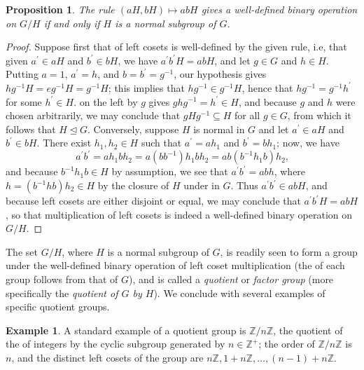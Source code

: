 \documentclass{article}
\theoremstyle{plain}
\newtheorem*{proposition*}{Proposition}
\theoremstyle{definition}
\newtheorem*{example*}{Example}
\begin{document}
\begin{proposition*}
The rule $(aH,bH)\mapsto abH$ gives a well-defined binary operation on $G/H$ if and only if $H$ is a normal subgroup 
of $G$.
\end{proposition*} 
\begin{proof}
Suppose first that  of left cosets is well-defined by the given rule, i.e, that given $a^\prime\in aH$ and 
$b^\prime\in bH$, we have $a^\prime b^\prime H=abH$, and let $g\in G$ and $h\in H$. Putting $a=1$, $a^\prime=h$, and $b=b^\prime=g^{-1}$, our hypothesis gives $hg^{-1}H=eg^{-1}H=g^{-1}H$; this implies that $hg^{-1}\in g^{-1}H$, hence that $hg^{-1}=g^{-1}h^\prime$ for some $h^\prime\in H$.  on the left by $g$ gives $ghg^{-1}=h^\prime\in H$, and because $g$ and $h$ were chosen arbitrarily, we may conclude that $gHg^{-1}\subseteq H$ for all $g\in G$, from which it follows that $H\unlhd G$. Conversely, suppose $H$ is normal in $G$ and let $a^\prime\in aH$ and $b^\prime\in bH$. There exist $h_1,h_2\in H$ such that $a^\prime=ah_1$ and $b^\prime=bh_1$; now, we have
\begin{equation*}
a^\prime b^\prime=ah_1bh_2=a(bb^{-1})h_1bh_2
=ab(b^{-1}h_1b)h_2\text{,}
\end{equation*}
and because $b^{-1}h_1b\in H$ by assumption, we see that $a^\prime b^\prime=abh$, where $h=(b^{-1}hb)h_2\in H$
by the closure of $H$ under  in $G$. Thus $a^\prime b^\prime\in abH$, and because left cosets 
are either disjoint or equal, we may conclude that $a^\prime b^\prime H=abH$, so that multiplication
of left cosets is indeed a well-defined binary operation on $G/H$. 
\end{proof}

The set $G/H$, where $H$ is a normal subgroup of $G$, is readily seen to form a group under the well-defined
binary operation of left coset multiplication (the  of each group  follows from that of $G$), and is called a \emph{quotient} or \emph{factor group} (more specifically
the \emph{quotient of $G$ by $H$}). We conclude with several examples of specific quotient groups.

\begin{example*}
A standard example of a quotient group is $\mathbb{Z}/n\mathbb{Z}$, the quotient of the  of integers by the cyclic subgroup generated by $n\in\mathbb{Z}^+$; the order of $\mathbb{Z}/n\mathbb{Z}$ is $n$, and the 
distinct left cosets of the group are $n\mathbb{Z},1+n\mathbb{Z},\ldots,(n-1)+n\mathbb{Z}$. 
\end{example*}
\end{document}

